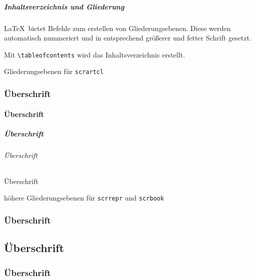 \begin{frame}[fragile]
    \frametitle{Inhaltsverzeichnis und Gliederung}
    \LaTeX \ bietet Befehle zum erstellen von Gliederungsebenen. Diese werden automatisch nummeriert und in entsprechend größerer und fetter Schrift gesetzt.

    Mit \verb+\tableofcontents+ wird das Inhaltsverzeichnis erstellt.

    \begin{block}{Gliederungsebenen für \texttt{scrartcl}}
        \begin{lstverbatim}
        \section{Überschrift}
        \subsection{Überschrift}
        \subsubsection{Überschrift}
        \paragraph{Überschrift} %
        \subparagraph{Überschrift} %
        \end{lstverbatim}
    \end{block}
    \begin{block}{höhere Gliederungsebenen für \texttt{scrrepr} und \texttt{scrbook}}
        \begin{lstverbatim}
        \part{Überschrift}
        \chapter{Überschrift}
        \section{Überschrift}
        \end{lstverbatim}
    \end{block}
\end{frame}

